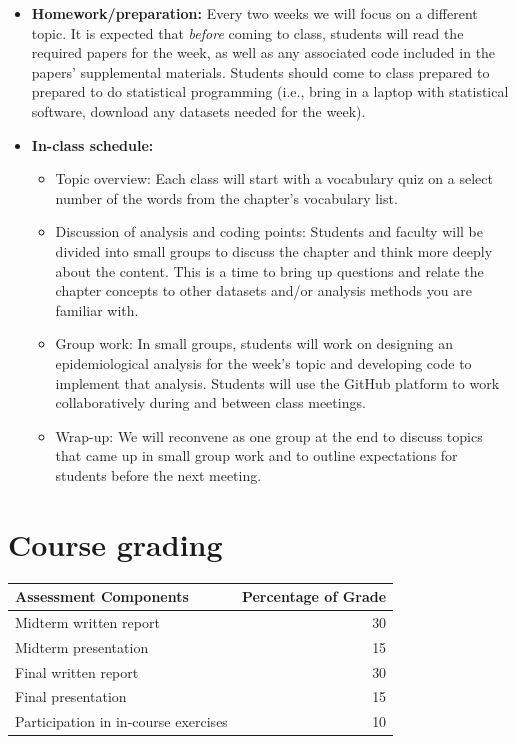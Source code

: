 \documentclass[
]{book}
\providecommand{\tightlist}{%
  \setlength{\itemsep}{0pt}\setlength{\parskip}{0pt}}
\begin{document}
\begin{itemize}
\tightlist
\item
  \textbf{Homework/preparation:} Every two weeks we will focus on a different topic.
  It is expected that \emph{before} coming to class, students will read the required
  papers for the week, as well as any associated code included in the papers'
  supplemental materials. Students should come to class prepared to prepared to do
  statistical programming (i.e., bring in a laptop with statistical software,
  download any datasets needed for the week).
\item
  \textbf{In-class schedule:}

  \begin{itemize}
  \tightlist
  \item
    Topic overview: Each class will start with a vocabulary quiz on a select
    number of the words from the chapter's vocabulary list.
  \item
    Discussion of analysis and coding points: Students and faculty will be
    divided into small groups to discuss the chapter and think more deeply about
    the content. This is a time to bring up questions and relate the chapter
    concepts to other datasets and/or analysis methods you are familiar with.
  \item
    Group work: In small groups, students will work on designing an
    epidemiological analysis for the week's topic and developing code to
    implement that analysis. Students will use the GitHub platform to
    work collaboratively during and between class meetings.
  \item
    Wrap-up: We will reconvene as one group at the end to discuss topics that
    came up in small group work and to outline expectations for students before
    the next meeting.
  \end{itemize}
\end{itemize}

\hypertarget{course-grading}{%
\section{Course grading}\label{course-grading}}

\begin{tabular}{l|r}
\hline
Assessment Components & Percentage of Grade\\
\hline
Midterm written report & 30\\
\hline
Midterm presentation & 15\\
\hline
Final written report & 30\\
\hline
Final presentation & 15\\
\hline
Participation in in-course exercises & 10\\
\hline
\end{tabular}
\end{document}
